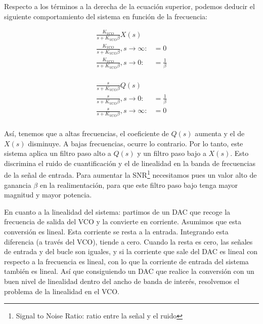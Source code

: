 \documentclass[12pt]{report} %
\begin{document}
	Respecto a los términos a la derecha de la ecuación superior, podemos deducir el siguiente comportamiento del sistema en función de la frecuencia:
	
	\begin{figure}[H]
		\label{vco-closed-loop-terms-x}
		\begin{equation}
		\begin{array}{lcl}
		\frac{K_{VCO}}{s + K_{VCO}\beta}X(s) & \\
		\frac{K_{VCO}}{s + K_{VCO}\beta}, s \to \infty: & = 0 \\
		\frac{K_{VCO}}{s + K_{VCO}\beta}, s \to 0: & = \frac{1}{\beta} \\
		\end{array}
		\end{equation}
	\end{figure}

	\begin{figure}[H]
		\label{vco-closed-loop-terms-q}
		\begin{equation}
		\begin{array}{lcl}
		\frac{s}{s + K_{VCO}\beta}Q(s) & \\
		\frac{s}{s + K_{VCO}\beta}, s \to 0: & = \frac{1}{\beta} \\
		\frac{s}{s + K_{VCO}\beta}, s \to \infty: & = 0 \\
		\end{array}
		\end{equation}
	\end{figure}

	Así, tenemos que a altas frecuencias, el coeficiente de $Q(s)$ aumenta y el de $X(s)$ disminuye. A bajas frecuencias, ocurre lo contrario. Por lo tanto, este sistema aplica un filtro paso alto a $Q(s)$ y un filtro paso bajo a $X(s)$. Esto discrimina el ruido de cuantificación y el de linealidad en la banda de frecuencias de la señal de entrada. Para aumentar la SNR\footnote{Signal to Noise Ratio: ratio entre la señal y el ruido} necesitamos pues un valor alto de ganancia $\beta$ en la realimentación, para que este filtro paso bajo tenga mayor magnitud y mayor potencia.
	
	En cuanto a la linealidad del sistema: partimos de un DAC que recoge la frecuencia de salida del VCO y la convierte en corriente. Asumimos que esta conversión es lineal. Esta corriente se resta a la entrada. Integrando esta diferencia (a través del VCO), tiende a cero. Cuando la resta es cero, las señales de entrada y del bucle son iguales, y si la corriente que sale del DAC es lineal con respecto a la frecuencia es lineal, con lo que la corriente de entrada del sistema también es lineal.  Así que consiguiendo un DAC que realice la conversión con un buen nivel de linealidad dentro del ancho de banda de interés, resolvemos el problema de la linealidad en el VCO.
	
\end{document}
